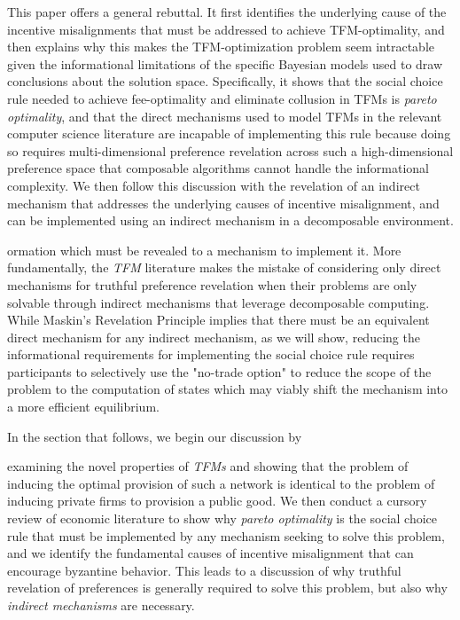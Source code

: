 \documentclass[sigconf,anonymous]{aamas}
\begin{document}
This paper offers a general rebuttal. It first identifies the underlying cause of the incentive misalignments that must be addressed to achieve TFM-optimality, and then explains why this makes the TFM-optimization problem seem intractable given the informational limitations of the specific Bayesian models used to draw conclusions about the solution space. Specifically, it shows that the social choice rule needed to achieve fee-optimality and eliminate collusion in TFMs is \textit{pareto optimality}, and that the direct mechanisms used to model TFMs in the relevant computer science literature are incapable of implementing this rule because doing so requires multi-dimensional preference revelation across such a high-dimensional preference space that composable algorithms cannot handle the informational complexity. We then follow this discussion with the revelation of an indirect mechanism that addresses the underlying causes of incentive misalignment, and can be implemented using an indirect mechanism in a decomposable environment.

ormation which must be revealed to a mechanism to implement it. More fundamentally, the \textit{TFM} literature makes the mistake of considering only direct mechanisms for truthful preference revelation when their problems are only solvable through indirect mechanisms that leverage decomposable computing. While Maskin's Revelation Principle implies that there must be an equivalent direct mechanism for any indirect mechanism, as we will show, reducing the informational requirements for implementing the social choice rule requires participants to selectively use the "no-trade option" to reduce the scope of the problem to the computation of states which may viably shift the mechanism into a more efficient equilibrium.

In the section that follows, we begin our discussion by 

examining the novel properties of \textit{TFMs} and showing that the problem of inducing the optimal provision of such a network is identical to the problem of inducing private firms to provision a public good. We then conduct a cursory review of economic literature to show why \textit{pareto optimality} is the social choice rule that must be implemented by any mechanism seeking to solve this problem, and we identify the fundamental causes of incentive misalignment that can encourage byzantine behavior. This leads to a discussion of why truthful revelation of preferences is generally required to solve this problem, but also why \textit{indirect mechanisms} are necessary.
\end{document}
